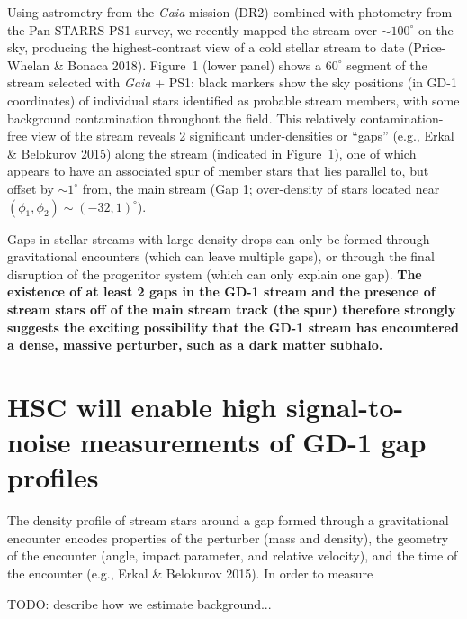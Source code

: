 \documentclass[11pt]{article}
\begin{document}
Using astrometry from the \textit{Gaia} mission (DR2) combined with photometry from the Pan-STARRS PS1 survey, we recently mapped the stream over $\sim 100^\circ$ on the sky, producing the highest-contrast view of a cold stellar stream to date (Price-Whelan \& Bonaca 2018).
Figure~1 (lower panel) shows a $60^\circ$ segment of the stream selected with \textit{Gaia} + PS1: black markers show the sky positions (in GD-1 coordinates) of individual stars identified as probable stream members, with some background contamination throughout the field.
This relatively contamination-free view of the stream reveals 2 significant under-densities or ``gaps'' (e.g., Erkal \& Belokurov 2015) along the stream (indicated in Figure~1), one of which appears to have an associated spur of member stars that lies parallel to, but offset by $\sim1^\circ$ from, the main stream (Gap 1; over-density of stars located near $(\phi_1, \phi_2) \sim (-32, 1)^\circ$).

Gaps in stellar streams with large density drops can only be formed through gravitational encounters (which can leave multiple gaps), or through the final disruption of the progenitor system (which can only explain one gap).
\textbf{The existence of at least 2 gaps in the GD-1 stream and the presence of stream stars off of the main stream track (the spur) therefore strongly suggests the exciting possibility that the GD-1 stream has encountered a dense, massive perturber, such as a dark matter subhalo.}

\section*{HSC will enable high signal-to-noise measurements of GD-1 gap profiles}

The density profile of stream stars around a gap formed through a gravitational encounter encodes properties of the perturber (mass and density), the geometry of the encounter (angle, impact parameter, and relative velocity), and the time of the encounter (e.g., Erkal \& Belokurov 2015).
In order to measure


TODO: describe how we estimate background...
\end{document}
